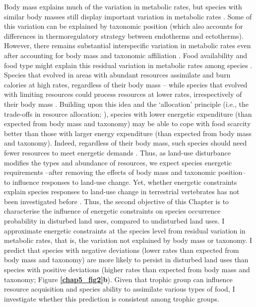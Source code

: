 Body mass explains much of the variation in metabolic rates, but species with similar body masses still display important variation in metabolic rates \citep{Mueller2001}. Some of this variation can be explained by taxonomic position (which also accounts for differences in thermoregulatory strategy between endotherms and ectotherms). However, there remains substantial interspecific variation in metabolic rates even after accounting for body mass and taxonomic affiliation \citep{Mueller2001, White2013}. Food availability and food type might explain this residual variation in metabolic rates among species \citep{Mueller2001}. Species that evolved in areas with abundant resources assimilate and burn calories at high rates, regardless of their body mass -- while species that evolved with limiting resources could process resources at lower rates, irrespectively of their body mass \citep{Mueller2001}. Building upon this idea and the `allocation' principle (i.e., the trade-offs in resource allocation; \citet{Auer2020}), species with lower energetic expenditure (than expected from body mass and taxonomy) may be able to cope with food scarcity better than those with larger energy expenditure (than expected from body mass and taxonomy). Indeed, regardless of their body mass, such species should need fewer resources to meet energetic demands \citep{Clarke2004a}. Thus, as land-use disturbance modifies the types and abundance of resources, we expect species energetic requirements --after removing the effects of body mass and taxonomic position-- to influence responses to land-use change. Yet, whether energetic constraints explain species responses to land-use change in terrestrial vertebrates has not been investigated before \citep{Hevia2017}. Thus, the second objective of this Chapter is to characterise the influence of energetic constraints on species occurrence probability in disturbed land uses, compared to undisturbed land uses. I approximate energetic constraints at the species level from residual variation in metabolic rates, that is, the variation not explained by body mass or taxonomy. I predict that species with negative deviations (lower rates than expected from body mass and taxonomy) are more likely to persist in disturbed land uses than species with positive deviations (higher rates than expected from body mass and taxonomy; Figure \textbf{\ref{chap5_fig2}b}). Given that trophic group can influence resource acquisition and species ability to assimilate various types of food, I investigate whether this prediction is consistent among trophic groups.

